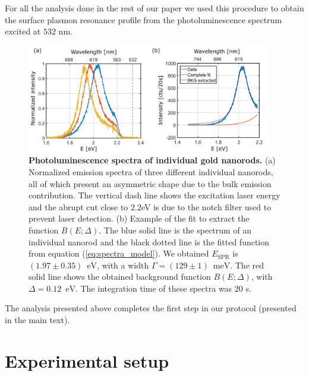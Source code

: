 \documentclass[journal=nalefd,manuscript=letter]{achemso}
\newcommand{\nm}{\ensuremath{\,\textrm{nm}}}
\newcommand{\eV}{\ensuremath{\,\textrm{eV}}}
\newcommand{\meV}{\ensuremath{\,\textrm{meV}}}
\begin{document}
For all the analysis done in the rest of our paper we used this procedure to obtain the
surface plasmon resonance profile from the photoluminescence spectrum excited at $532$ nm.

\begin{figure}[htp] \centering
\includegraphics[width=0.95\textwidth]{Figures/Supplementary/09_Error_vs_Wavelength/532nm_spectra_and_bkg.png}
\caption{\textbf{Photoluminescence spectra of individual gold nanorods.} 
(a) Normalized emission spectra of three different individual nanorods, all of which present 
an asymmetric shape due to the bulk emission contribution. The vertical dash line shows the 
excitation laser energy and the abrupt cut close to $2.2$eV is due to the notch filter used 
to prevent laser detection. (b) Example of the fit to extract the function $B(E;\Delta)$. 
The blue solid line is the spectrum of an individual nanorod and the black dotted line is the 
fitted function from equation (\ref{eq:spectra_model}). We obtained $E_\textrm{SPR}$ is $(1.97 \pm 0.35)$ \eV, 
with a width $\Gamma=(129 \pm 1)$ \meV.
The red solid line shows the obtained background function $B(E;\Delta)$, with $\Delta = 0.12$ \eV. 
The integration time of these spectra was $20$ s.}
\label{fig:PL_spectra}
\end{figure}

The analysis presented above completes the  first step in our protocol 
(presented in the main text). 


\pagebreak
\section{Experimental setup}\label{sec:setup}
\end{document}
